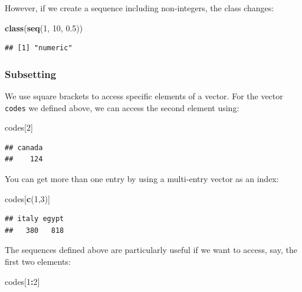 \documentclass[
]{article}
\newenvironment{Shaded}{\begin{snugshade}}{\end{snugshade}}
\newcommand{\DecValTok}[1]{\textcolor[rgb]{0.00,0.00,0.81}{#1}}
\newcommand{\FloatTok}[1]{\textcolor[rgb]{0.00,0.00,0.81}{#1}}
\newcommand{\FunctionTok}[1]{\textcolor[rgb]{0.13,0.29,0.53}{\textbf{#1}}}
\newcommand{\NormalTok}[1]{#1}
\newcommand{\SpecialCharTok}[1]{\textcolor[rgb]{0.81,0.36,0.00}{\textbf{#1}}}
\begin{document}
However, if we create a sequence including non-integers, the class
changes:

\begin{Shaded}
\begin{Highlighting}[]
\FunctionTok{class}\NormalTok{(}\FunctionTok{seq}\NormalTok{(}\DecValTok{1}\NormalTok{, }\DecValTok{10}\NormalTok{, }\FloatTok{0.5}\NormalTok{))}
\end{Highlighting}
\end{Shaded}

\begin{verbatim}
## [1] "numeric"
\end{verbatim}

\subsubsection{Subsetting}\label{subsetting}

We use square brackets to access specific elements of a vector. For the
vector \texttt{codes} we defined above, we can access the second element
using:

\begin{Shaded}
\begin{Highlighting}[]
\NormalTok{codes[}\DecValTok{2}\NormalTok{]}
\end{Highlighting}
\end{Shaded}

\begin{verbatim}
## canada 
##    124
\end{verbatim}

You can get more than one entry by using a multi-entry vector as an
index:

\begin{Shaded}
\begin{Highlighting}[]
\NormalTok{codes[}\FunctionTok{c}\NormalTok{(}\DecValTok{1}\NormalTok{,}\DecValTok{3}\NormalTok{)]}
\end{Highlighting}
\end{Shaded}

\begin{verbatim}
## italy egypt 
##   380   818
\end{verbatim}

The sequences defined above are particularly useful if we want to
access, say, the first two elements:

\begin{Shaded}
\begin{Highlighting}[]
\NormalTok{codes[}\DecValTok{1}\SpecialCharTok{:}\DecValTok{2}\NormalTok{]}
\end{Highlighting}
\end{Shaded}
\end{document}

